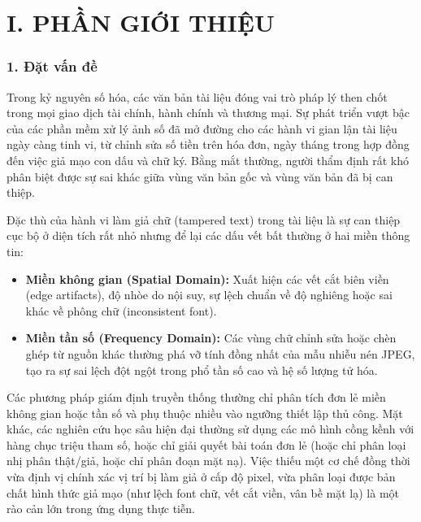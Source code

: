\chapter{I. PHẦN GIỚI THIỆU}

\subsection{1. Đặt vấn đề}

\indent\indent Trong kỷ nguyên số hóa, các văn bản tài liệu đóng vai trò pháp lý then chốt trong mọi giao dịch tài chính, hành chính và thương mại. Sự phát triển vượt bậc của các phần mềm xử lý ảnh số đã mở đường cho các hành vi gian lận tài liệu ngày càng tinh vi, từ chỉnh sửa số tiền trên hóa đơn, ngày tháng trong hợp đồng đến việc giả mạo con dấu và chữ ký. Bằng mắt thường, người thẩm định rất khó phân biệt được sự sai khác giữa vùng văn bản gốc và vùng văn bản đã bị can thiệp.\vspace{0.3cm}

Đặc thù của hành vi làm giả chữ (tampered text) trong tài liệu là sự can thiệp cục bộ ở diện tích rất nhỏ nhưng để lại các dấu vết bất thường ở hai miền thông tin:\vspace{-0.1cm}
\begin{itemize}[label={--}, itemsep=1pt]
    \item \textbf{Miền không gian (Spatial Domain):} Xuất hiện các vết cắt biên viền (edge artifacts), độ nhòe do nội suy, sự lệch chuẩn về độ nghiêng hoặc sai khác về phông chữ (inconsistent font).
    \item \textbf{Miền tần số (Frequency Domain):} Các vùng chữ chỉnh sửa hoặc chèn ghép từ nguồn khác thường phá vỡ tính đồng nhất của mẫu nhiễu nén JPEG, tạo ra sự sai lệch đột ngột trong phổ tần số cao và hệ số lượng tử hóa.
\end{itemize}

Các phương pháp giám định truyền thống thường chỉ phân tích đơn lẻ miền không gian hoặc tần số và phụ thuộc nhiều vào ngưỡng thiết lập thủ công. Mặt khác, các nghiên cứu học sâu hiện đại thường sử dụng các mô hình cồng kềnh với hàng chục triệu tham số, hoặc chỉ giải quyết bài toán đơn lẻ (hoặc chỉ phân loại nhị phân thật/giả, hoặc chỉ phân đoạn mặt nạ). Việc thiếu một cơ chế đồng thời vừa định vị chính xác vị trí bị làm giả ở cấp độ pixel, vừa phân loại được bản chất hình thức giả mạo (như lệch font chữ, vết cắt viền, vân bề mặt lạ) là một rào cản lớn trong ứng dụng thực tiễn.\vspace{0.3cm}

